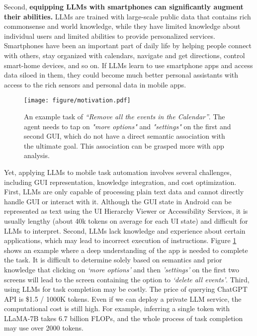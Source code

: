 Second, \textbf{equipping LLMs with smartphones can significantly augment their abilities.}
LLMs are trained with large-scale public data that contains rich commonsense and world knowledge, while they have limited knowledge about individual users and limited abilities to provide personalized services.
Smartphones have been an important part of daily life by helping people connect with others, stay organized with calendars, navigate and get directions, control smart-home devices, and so on.
If LLMs learn to use smartphone apps and access data siloed in them, they could become much better personal assistants with access to the rich sensors and personal data in mobile apps.
\begin{figure}
    \centering
    \texttt{[image: figure/motivation.pdf]}
    \caption{An example task of \textit{``Remove all the events in the Calendar''}. The agent needs to tap on \textit{"more options"} and \textit{"settings"} on the first and second GUI, which do not have a direct semantic association with the ultimate goal. This association can be grasped more  with app analysis.}
    \label{fig:motivation}
    \vspace{-0.2cm}
\end{figure}

Yet, applying LLMs to mobile task automation involves several challenges, including GUI representation, knowledge integration, and cost optimization. 
First, LLMs are only capable of processing plain text data and cannot directly handle GUI or interact with it. Although the GUI state in Android can be represented as text using the UI Hierarchy Viewer or Accessibility Services, it is usually lengthy (about 40k tokens on average for each UI state) and difficult for LLMs to interpret.
Second, LLMs lack knowledge and experience about certain applications, which may lead to incorrect execution of instructions. Figure \ref{fig:motivation} shows an example where a deep understanding of the app is needed to complete the task. It is difficult to determine solely based on semantics and prior knowledge that clicking on \textit{`more options'} and then \textit{'settings'} on the first two screens will lead to the screen containing the option to \textit{`delete all events'}.
Third, using LLMs for task completion may be costly. The price of querying ChatGPT API \cite{chatgpt} is \$1.5 / 1000K tokens. Even if we can deploy a private LLM service, the computational cost is still high. For example, inferring a single token with LLaMA-7B \cite{touvron2023llama} takes 6.7 billion FLOPs,
and the whole process of task completion may use over 2000 tokens.


